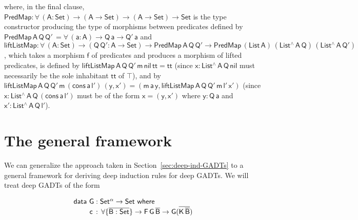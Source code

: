 \documentclass[9pt]{entcs}
\begin{document}
\noindent
where, in the final clause, $\mathsf{PredMap : \forall\, (A : Set) \to
  (A \to Set) \to (A \to Set) \to Set }$ is the type constructor
producing the type of morphisms between predicates defined by
$\mathsf{PredMap \,A\, Q\,Q'\, = \forall\, (a : A) \to Q\,a \to
  Q'\,a}$ and $\mathsf{liftListMap : \forall\, (A : Set) \to (Q \, Q'
  : A \to Set) \to PredMap\,A\,Q\,Q' \to PredMap\,(List\,A)
  \,(List^{\wedge}\, A\, Q)\, (List^{\wedge}\, A\, Q')}$, which takes
a morphism $\mathsf{f}$ of predicates and produces a morphism of
lifted predicates, is defined by $\mathsf{liftListMap\, A\, Q\, Q'\,
  m\, nil\, tt = tt}$ (since $\mathsf{x : List^{\wedge}\, A\, Q\,
  nil}$ must necessarily be the sole inhabitant $\mathsf{tt}$ of
$\mathsf{\top}$), and by $\mathsf{liftListMap\, A\, Q\, Q'\, m\,
  (cons\, a\, l')\, (y, x') = (m\,a\,y, liftListMap\, A\, Q\, Q'\, m\,
  l'\, x')}$ (since $\mathsf{x : List^{\wedge}\, A\, Q\, (cons\, a\,
  l')}$ must be of the form $\mathsf{x = (y, x')}$ where
$\mathsf{y : Q\,a}$ and $\mathsf{x' : List^{\wedge}\, A\, Q\, l'}$).

\vspace*{-0.05in}

\section{The general framework}\label{sec:framework}

We can generalize the approach taken in
Section~\ref{sec:deep-ind-GADTs} to a general framework for deriving
deep induction rules for deep GADTs. We will treat deep GADTs of the
form 

\vspace*{-0.05in}

\begin{equation}\label{eq:gadts}
\begin{array}{l}
  \mathsf{data\ G : Set^\alpha
    \to Set\ where}\\
\mathsf{\;\;\;\;\;\;\;\;c\, :\, \forall \{\overline{B : Set}\} \to F\,G\,\overline{B} \to G (\overline{K\,\overline{B}})}
\end{array}
\end{equation}
\end{document}
